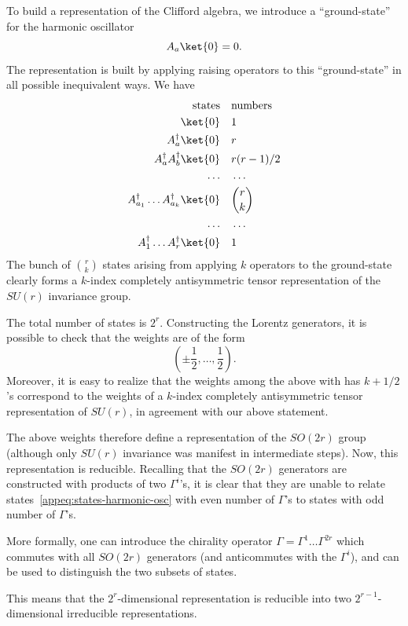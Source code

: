 To build a representation of the Cliﬀord algebra, we introduce a “ground-state” for the harmonic oscillator
\begin{equation}
    A_a \ket{0} = 0.
\end{equation}
The representation is built by applying raising operators to this “ground-state” in all possible inequivalent ways. We have
\begin{equation}\label{appeq:states-harmonic-osc}
\begin{aligned}
    \textup{states} \quad &\textup{numbers} \\
    \ket{0} \quad &1  \\
    A^\dagger_a\ket{0} \quad &r \\
    A^\dagger_a A^\dagger_b \ket{0} \quad &r(r-1)/2 \\
    \dots \quad &\dots \\
    A^\dagger_{a_1} \dots A^\dagger_{a_k} \ket{0} \quad &\binom{r}{k} \\
    \dots \quad &\dots \\
    A^\dagger_1 \dots A^\dagger_r \ket{0} \quad &1
\end{aligned}
\end{equation}
The bunch of $\binom{r}{k}$ states arising from applying $k$ operators to the ground-state clearly forms a $k$-index completely antisymmetric tensor representation of the $SU(r)$ invariance group.

The total number of states is $2^r$. Constructing the Lorentz generators, it is possible to check that the weights are of the form
\begin{equation}
    \left( \pm \frac{1}{2}, \dots, \frac{1}{2} \right).
\end{equation}
Moreover, it is easy to realize that the weights among the above with has $k +1/2$'s correspond to the weights of a $k$-index completely antisymmetric tensor representation of $SU(r)$, in agreement with our above statement.

The above weights therefore define a representation of the $SO(2r)$ group (although only $SU(r)$ invariance was manifest in intermediate steps). Now, this representation is reducible. Recalling that the $SO(2r)$ generators are constructed with products of two $\Gamma^i$'s, it is clear that they are unable to relate states~\eqref{appeq:states-harmonic-osc} with even number of $\Gamma$'s to states with odd number of $\Gamma$'s. 

More formally, one can introduce the chirality operator $\Gamma = \Gamma^1 \dots \Gamma^{2r}$ which commutes with all $SO(2r)$ generators (and anticommutes with the $\Gamma^i$), and can be used to distinguish the two subsets of states.

This means that the $2^r$-dimensional representation is reducible into two $2^{r-1}$-dimensional irreducible representations.